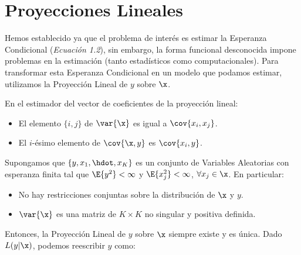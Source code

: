 \section{Proyecciones Lineales}

Hemos establecido ya que el problema de interés es estimar la Esperanza Condicional (\textit{Ecuación 1.2}), sin embargo, la forma funcional desconocida impone problemas en la estimación (tanto estadísticos como computacionales). Para transformar esta Esperanza Condicional en un modelo que podamos estimar, utilizamos la Proyección Lineal de $y$ sobre $\x$.\\


\bigskip
En el estimador del vector de coeficientes de la proyección lineal:
\begin{itemize}
    \item El elemento $\lbrace i,j \rbrace$ de $\var{\x}$ es igual a $\cov{x_i,x_j}$.
    \item El $i$-ésimo elemento de $\cov{\x,y}$ es $\cov{x_i,y}$.
\end{itemize}

\bigskip
Supongamos que $\lbrace y,x_1,\hdot,x_K \rbrace$ es un conjunto de Variables Aleatorias con esperanza finita tal que $\E{y^2}<\infty$ y $\E{x_{j}^2}<\infty$, $\forall x_j \in \x$. En particular:
\begin{itemize}
    \item No hay restricciones conjuntas sobre la distribución de $\x$ y $y$.
    \item $\var{\x}$ es una matriz de $K\times K$ no singular y positiva definida.
\end{itemize}

\bigskip
Entonces, la Proyección Lineal de $y$ sobre $\x$ siempre existe y es única. Dado $L(y|\x)$, podemos reescribir $y$ como:

